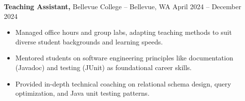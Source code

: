 \documentclass[11pt]{article}       %
\begin{document}

\textbf{Teaching Assistant,} {Bellevue College} -- Bellevue, WA \hfill April 2024 -- December 2024 \\
\vspace{-9pt}
\begin{itemize}
  \item Managed office hours and group labs, adapting teaching methods to suit diverse student backgrounds and learning speeds.
  \item Mentored students on software engineering principles like documentation (Javadoc) and testing (JUnit) as foundational career skills.
  \item Provided in-depth technical coaching on relational schema design, query optimization, and Java unit testing patterns.
\end{itemize}

\end{document}
